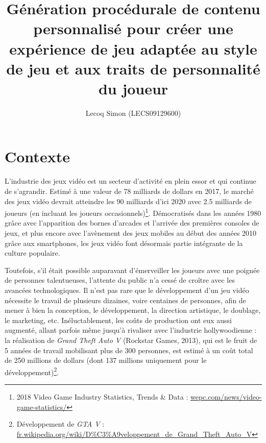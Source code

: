 \documentclass[a4paper,11pt]{article}
\title{Génération procédurale de contenu personnalisé pour créer une expérience de jeu adaptée au style de jeu et aux traits de personnalité du joueur}
\author{Lecoq Simon (LECS09129600)}
\date{}
\begin{document}
    \maketitle
    \setlength{\parskip}{1em}

    \section{Contexte}\label{section:context}
    
      L'industrie des jeux vidéo est un secteur d'activité en plein essor et qui continue de s'agrandir. 
      Estimé à une valeur de 78 milliards de dollars en 2017, le marché des jeux vidéo devrait atteindre les 90 milliards d'ici 2020 avec 2.5 milliards de joueurs (en incluant les joueurs occasionnels)\footnote{2018 Video Game Industry Statistics, Trends \& Data : \url{wepc.com/news/video-game-statistics/}}.
      Démocratisés dans les années 1980 grâce avec l'apparition des bornes d'arcades et l'arrivée des premières consoles de jeux, et plus encore avec l'avènement des jeux mobiles au début des années 2010 grâce aux smartphones, les jeux vidéo font désormais partie intégrante de la culture populaire.
    
      Toutefois, s'il était possible auparavant d'émerveiller les joueurs avec une poignée de personnes talentueuses, l'attente du public n'a cessé de croître avec les avancées technologiques. 
      Il n'est pas rare que le développement d'un jeu vidéo nécessite le travail de plusieurs dizaines, voire centaines de personnes, afin de mener à bien la conception, le développement, la direction artistique, le doublage, le marketing, etc.
      Inéluctablement, les coûts de production ont eux aussi augmenté, allant parfois même jusqu'à rivaliser avec l'industrie hollywoodienne : 
      la réalisation de \textit{Grand Theft Auto V} (Rockstar Games, 2013), qui est le fruit de 5 années de travail mobilisant plus de 300 personnes, est estimé à un coût total de 250 millions de dollars (dont 137 millions uniquement pour le développement)\footnote{Développement de \textit{GTA V} : \url{fr.wikipedia.org/wiki/D\%C3\%A9veloppement_de_Grand_Theft_Auto_V}}.
\end{document}
